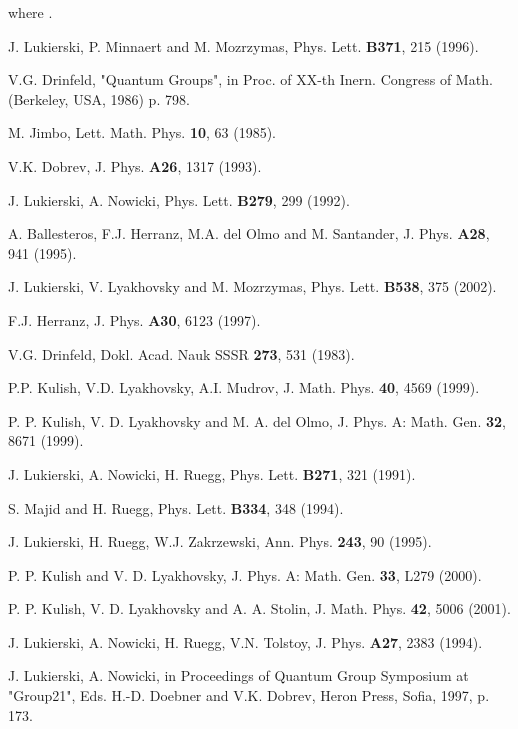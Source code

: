 \documentclass[a4paper,12pt,showkeys]{article}
\begin{document}
where \coordHE{}.



 \begin{thebibliography}{99}

 J. Lukierski, P. Minnaert and M. Mozrzymas, Phys.
 Lett. {\bf B371}, 215 (1996).


  V.G. Drinfeld, "Quantum Groups", in Proc. of XX-th
 Inern. Congress of Math. (Berkeley, USA, 1986) p. 798.



  M. Jimbo, Lett. Math. Phys. {\bf 10}, 63
  (1985).



 V.K. Dobrev, J. Phys. {\bf A26}, 1317 (1993).



 J. Lukierski, A. Nowicki, Phys. Lett. {\bf
B279}, 299 (1992).





  A. Ballesteros, F.J. Herranz, M.A. del Olmo and M.
 Santander, J. Phys. {\bf A28}, 941 (1995).

 J. Lukierski, V. Lyakhovsky and M. Mozrzymas, Phys.
 Lett. {\bf B538}, 375 (2002).


 F.J. Herranz, J. Phys. {\bf A30}, 6123 (1997).

 V.G. Drinfeld, Dokl. Acad. Nauk SSSR {\bf 273}, 531
(1983).


 P.P. Kulish, V.D. Lyakhovsky, A.I. Mudrov,
J. Math. Phys. {\bf 40}, 4569 (1999).


 P. P. Kulish, V. D. Lyakhovsky
 and M. A. del Olmo, J. Phys. A: Math. Gen. {\bf 32}, 8671 (1999).

  J. Lukierski, A. Nowicki, H. Ruegg,
 Phys. Lett. {\bf B271}, 321 (1991).




 S. Majid and H. Ruegg,
 Phys. Lett.  {\bf B334}, 348 (1994).

 J. Lukierski, H. Ruegg, W.J. Zakrzewski, Ann.
 Phys. {\bf 243}, 90 (1995).




 P. P. Kulish and V. D. Lyakhovsky, J. Phys. A: Math. Gen. {\bf %
33}, L279 (2000).

 P. P. Kulish, V. D. Lyakhovsky and A. A. Stolin, J. Math.
Phys. {\bf 42}, 5006 (2001).

 J. Lukierski, A. Nowicki, H. Ruegg, V.N. Tolstoy,
J. Phys. {\bf A27}, 2383 (1994).

 J. Lukierski, A. Nowicki, in Proceedings of Quantum Group
 Symposium at "Group21", Eds. H.-D. Doebner and V.K. Dobrev, Heron Press,
 Sofia, 1997, p. 173.

\end{thebibliography}
\end{document}
